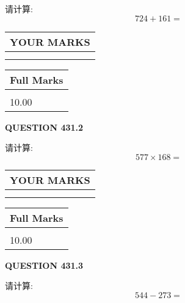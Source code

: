 \documentclass{ctexart}
\begin{document}
  
 
请计算:
\begin{equation}
724 +  %
161 = \nonumber
\end{equation}
 

 

 
  
\vspace{0.2in}
  
\noindent\begin{tabular}{|l|}
\hline
 YOUR MARKS  \\
\hline
 \\ 
 \\ 
\hline
\end{tabular}
\hspace{0.05in} \begin{tabular}{|l|}
\hline
 Full Marks  \\
\hline
 \\ 
10.00 \\
\hline
\end{tabular}
{\textbf{\Large{QUESTION
431.2 
}}}
  
  
 
请计算:
\begin{equation}
577  \times    %
168 = \nonumber
\end{equation}
 

 

 
  
\vspace{0.2in}
  
\noindent\begin{tabular}{|l|}
\hline
 YOUR MARKS  \\
\hline
 \\ 
 \\ 
\hline
\end{tabular}
\hspace{0.05in} \begin{tabular}{|l|}
\hline
 Full Marks  \\
\hline
 \\ 
10.00 \\
\hline
\end{tabular}
{\textbf{\Large{QUESTION
431.3 
}}}
  
  
 
请计算:
\begin{equation}
544 -   %
273 = \nonumber
\end{equation}
 

 

 
  
\vspace{0.2in}
  
\end{document}
